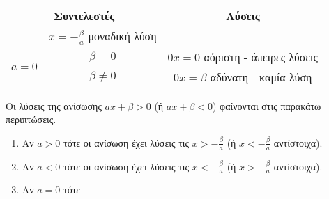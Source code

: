 \begin{center}
\begin{tabular}{c|c|c}
\hline\multicolumn{2}{c}{\textbf{Συντελεστές}} & \textbf{Λύσεις} \rule[-2ex]{0pt}{5.5ex}\\ 
\hhline{===}  \multicolumn{2}{c}{$a\neq0$} &  $ x=-\frac{\beta}{a} $ μοναδική λύση \rule[-2ex]{0pt}{5.5ex}\\ 
\hline \multirow{3}{*}{$a=0$}  & $ \beta=0 $ & $ 0x=0 $ αόριστη - άπειρες λύσεις \rule[-2ex]{0pt}{5.5ex}\\
\hhline{~--} \rule[-2ex]{0pt}{5.5ex}   & $ \beta\neq0 $ & $ 0x=\beta $ αδύνατη - καμία λύση \\ 
\hline 
\end{tabular}
\end{center}
Οι λύσεις της ανίσωσης $ ax+\beta>0 $ (ή $ ax+\beta<0 $) φαίνονται στις παρακάτω περιπτώσεις.
\begin{enumerate}
\item Αν $ a>0 $ τότε οι ανίσωση έχει λύσεις τις $ x>-\frac{\beta}{a} $ (ή $ x<-\frac{\beta}{a} $ αντίστοιχα).
\item Αν $ a<0 $ τότε οι ανίσωση έχει λύσεις τις $ x<-\frac{\beta}{a} $ (ή $ x>-\frac{\beta}{a} $ αντίστοιχα).
\item Αν $ a=0 $ τότε
\end{enumerate}
